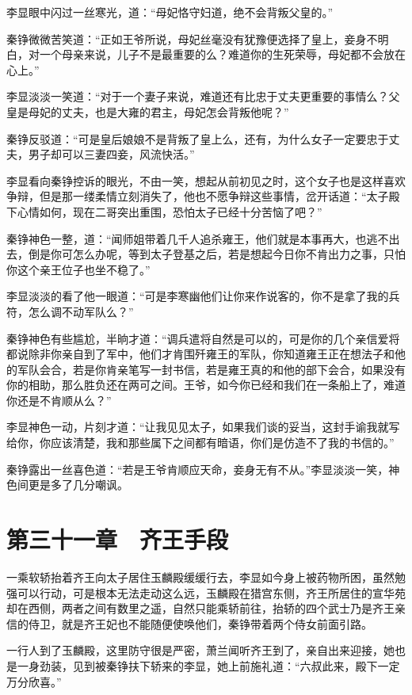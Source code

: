 李显眼中闪过一丝寒光，道：“母妃恪守妇道，绝不会背叛父皇的。”

秦铮微微苦笑道：“正如王爷所说，母妃丝毫没有犹豫便选择了皇上，妾身不明白，对一个母亲来说，儿子不是最重要的么？难道你的生死荣辱，母妃都不会放在心上。”

李显淡淡一笑道：“对于一个妻子来说，难道还有比忠于丈夫更重要的事情么？父皇是母妃的丈夫，也是大雍的君主，母妃怎会背叛他呢？”

秦铮反驳道：“可是皇后娘娘不是背叛了皇上么，还有，为什么女子一定要忠于丈夫，男子却可以三妻四妾，风流快活。”

李显看向秦铮控诉的眼光，不由一笑，想起从前初见之时，这个女子也是这样喜欢争辩，但是那一缕柔情立刻消失了，他也不愿争辩这些事情，岔开话道：“太子殿下心情如何，现在二哥突出重围，恐怕太子已经十分苦恼了吧？”

秦铮神色一整，道：“闻师姐带着几千人追杀雍王，他们就是本事再大，也逃不出去，倒是你可怎么办呢，等到太子登基之后，若是想起今日你不肯出力之事，只怕你这个亲王位子也坐不稳了。”

李显淡淡的看了他一眼道：“可是李寒幽他们让你来作说客的，你不是拿了我的兵符，怎么调不动军队么？”

秦铮神色有些尴尬，半晌才道：“调兵遣将自然是可以的，可是你的几个亲信爱将都说除非你亲自到了军中，他们才肯围歼雍王的军队，你知道雍王正在想法子和他的军队会合，若是你肯亲笔写一封书信，若是雍王真的和他的部下会合，如果没有你的相助，那么胜负还在两可之间。王爷，如今你已经和我们在一条船上了，难道你还是不肯顺从么？”

李显神色一动，片刻才道：“让我见见太子，如果我们谈的妥当，这封手谕我就写给你，你应该清楚，我和那些属下之间都有暗语，你们是仿造不了我的书信的。”

秦铮露出一丝喜色道：“若是王爷肯顺应天命，妾身无有不从。”李显淡淡一笑，神色间更是多了几分嘲讽。

\chapter{第三十一章　齐王手段}

一乘软轿抬着齐王向太子居住玉麟殿缓缓行去，李显如今身上被药物所困，虽然勉强可以行动，可是根本无法走动这么远，玉麟殿在猎宫东侧，齐王所居住的宣华苑却在西侧，两者之间有数里之遥，自然只能乘轿前往，抬轿的四个武士乃是齐王亲信的侍卫，就是齐王妃也不能随便使唤他们，秦铮带着两个侍女前面引路。

一行人到了玉麟殿，这里防守很是严密，萧兰闻听齐王到了，亲自出来迎接，她也是一身劲装，见到被秦铮扶下轿来的李显，她上前施礼道：“六叔此来，殿下一定万分欣喜。”

